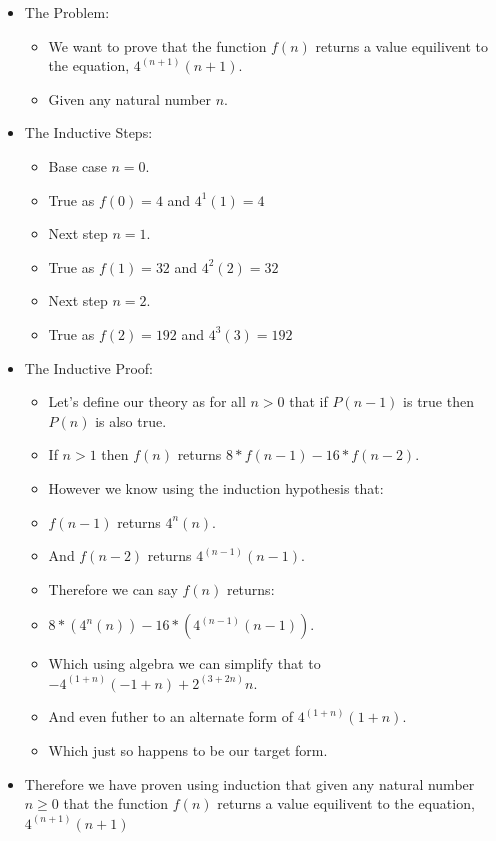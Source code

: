 \documentclass{article}
\begin{document}
\begin{enumerate}
\begin{enumerate}
      \begin{itemize}
        \item The Problem:
        \begin{itemize}
          \item We want to prove that the function $f(n)$ returns a value equilivent to the equation, $4^{(n + 1)}(n + 1)$.
          \item Given any natural number $n$.
        \end{itemize}
        \item The Inductive Steps:
        \begin{itemize}
          \item Base case $n = 0$. 
          \item True as $f(0) = 4$ and $4^1(1) = 4$
          \item Next step $n = 1$. 
          \item True as $f(1) = 32$ and $4^2(2) = 32$
          \item Next step $n = 2$. 
          \item True as $f(2) = 192$ and $4^3(3) = 192$
        \end{itemize}
        \item The Inductive Proof:
        \begin{itemize}
          \item Let's define our theory as for all $n > 0$ that if $P(n - 1)$ is true then $P(n)$ is also true. 
          \item If $n > 1$ then $f(n)$ returns $8*f(n - 1) - 16*f(n - 2)$. 
          \item However we know using the induction hypothesis that:          
          \item $f(n - 1)$ returns $4^n(n)$.
          \item And $f(n - 2)$ returns $4^{(n - 1)}(n - 1)$.
          \item Therefore we can say $f(n)$ returns:
          \item $8*(4^n(n)) - 16*(4^{(n - 1)}(n - 1))$.
          \item Which using algebra we can simplify that to $-4^{(1 + n)} (-1 + n) + 2^{(3 + 2 n)} n$.
          \item And even futher to an alternate form of $4^{(1 + n)} (1 + n)$.
          \item Which just so happens to be our target form.
        \end{itemize}
        \item Therefore we have proven using induction that given any natural number $n \geq 0$ that the function $f(n)$ returns a value equilivent to the equation, $4^{(n + 1)}(n + 1)$
      \end{itemize}
    \end{enumerate}


\end{enumerate}
\end{document}
